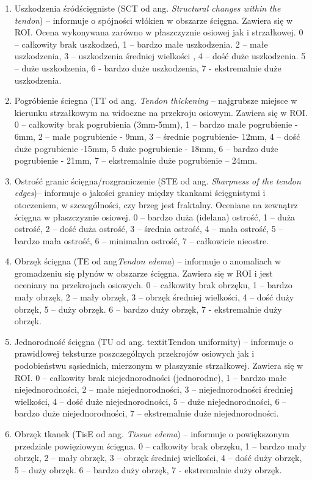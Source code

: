 \begin{enumerate}
	\item Uszkodzenia śródścięgniste (SCT od ang. \textit{Structural changes within the tendon}) -- informuje o spójności włókien w obszarze ścięgna. Zawiera się w ROI. Ocena wykonywana zarówno w płaszczyznie osiowej jak i strzałkowej. 0 – całkowity brak uszkodzeń, 1 – bardzo małe uszkodzenia. 2 – małe uszkodzenia, 3 – uszkodzenia średniej wielkości , 4 – dość duże uszkodzenia. 5 – duże uszkodzenia, 6 - bardzo duże uszkodzenia, 7 - ekstremalnie duże uszkodzenia.
	\item Pogróbienie ściegna (TT od ang. \textit{Tendon thickening} -- najgrubsze miejsce w kierunku strzałkowym na widoczne na przekroju osiowym. Zawiera się w ROI. 0 – całkowity brak pogrubienia (3mm-5mm), 1 – bardzo małe pogrubienie - 6mm, 2 – małe pogrubienie - 9mm, 3 – średnie pogrubienie- 12mm, 4 –  dość duże pogrubienie -15mm, 5 duże pogrubienie - 18mm, 6 – bardzo duże pogrubienie - 21mm, 7 – ekstremalnie duże pogrubienie – 24mm.
	\item Ostrość granic ścięgna/rozgraniczenie (STE od ang. \textit{Sharpness of the tendon edges})-- informuje o jakości granicy między tkankami ścięgnistymi i otoczeniem, w szczególności, czy brzeg jest fraktalny. Oceniane na zewnątrz ścięgna w płaszczyznie osiowej. 0 – bardzo duża (idelana) ostrość, 1 – duża ostrość, 2 – dość duża ostrość, 3 – średnia ostrość, 4 – mała ostrość, 5 – bardzo mała ostrość, 6 – minimalna ostrość, 7 – całkowicie nieostre.
	\item Obrzęk ścięgna (TE od ang\textit{Tendon edema}) -- informuje o anomaliach w gromadzeniu się płynów w obszarze ścięgna. Zawiera się w ROI i jest oceniany na przekrojach osiowych. 0 – całkowity brak obrzęku, 1 – bardzo mały obrzęk, 2 – mały obrzęk, 3 – obrzęk średniej wielkości, 4 – dość duży obrzęk, 5 – duży obrzęk. 6 – bardzo duży obrzęk, 7 - ekstremalnie duży obrzęk.
	\item Jednorodność ścięgna (TU od ang. textit{Tendon uniformity}) -- informuje o prawidłowej teksturze poszczególnych przekrojów osiowych jak i podobieństwu sąsiednich, mierzonym w płaszyznie strzałkowej. Zawiera się w ROI. 0 – całkowity brak niejednorodności (jednorodne), 1 – bardzo małe niejednorodności, 2 – małe niejednorodności, 3 – niejednorodności średniej wielkości, 4 – dość duże niejednorodności, 5 – duże niejednorodności, 6 – bardzo duże niejednorodności, 7 –  ekstremalnie duże niejednorodności. 
	\item Obrzęk tkanek (TisE od ang. \textit{Tissue edema}) -- informuje o powiększonym przedziale powięziowym ścięgna. 0  – całkowity brak obrzęku, 1 – bardzo mały obrzęk, 2 – mały obrzęk, 3 – obrzęk średniej wielkości, 4 – dość duży obrzęk, 5 – duży obrzęk. 6 – bardzo duży obrzęk, 7 - ekstremalnie duży obrzęk.
\end{enumerate}

